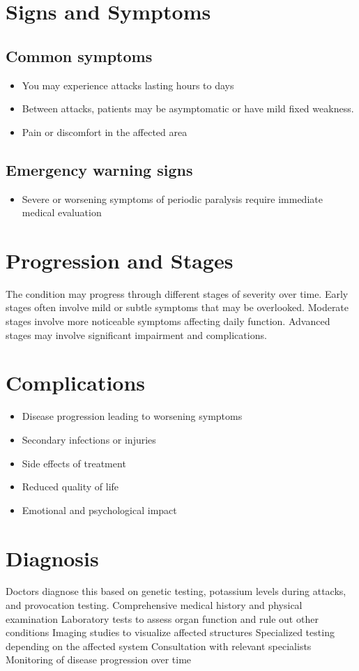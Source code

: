 \section{Signs and Symptoms}

\subsection{Common symptoms}
\begin{itemize}[noitemsep]
  \item You may experience attacks lasting hours to days
  \item Between attacks, patients may be asymptomatic or have mild fixed weakness.
  \item Pain or discomfort in the affected area
  \end{itemize}

\subsection{Emergency warning signs}
\begin{itemize}[noitemsep]
  \item Severe or worsening symptoms of periodic paralysis require immediate medical evaluation
\end{itemize}
\section{Progression and Stages}
The condition may progress through different stages of severity over time. Early stages often involve mild or subtle symptoms that may be overlooked. Moderate stages involve more noticeable symptoms affecting daily function. Advanced stages may involve significant impairment and complications.
\section{Complications}
\begin{itemize}[noitemsep]
  \item Disease progression leading to worsening symptoms
  \item Secondary infections or injuries
  \item Side effects of treatment
  \item Reduced quality of life
  \item Emotional and psychological impact
\end{itemize}
\section{Diagnosis}
Doctors diagnose this based on genetic testing, potassium levels during attacks, and provocation testing. Comprehensive medical history and physical examination Laboratory tests to assess organ function and rule out other conditions Imaging studies to visualize affected structures Specialized testing depending on the affected system Consultation with relevant specialists Monitoring of disease progression over time

